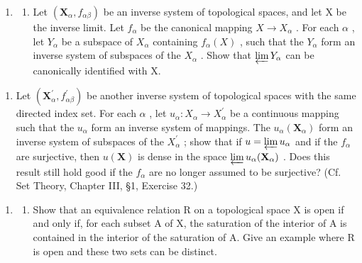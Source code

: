 \begin{enumerate}
\def\labelenumi{\arabic{enumi})}
\setcounter{enumi}{9}
\tightlist
\item
  \begin{enumerate}
  \def\labelenumii{\alph{enumii})}
  \tightlist
  \item
    Let \((\mathbf{X}_{\alpha}, f_{\alpha\beta})\) be an inverse system of topological spaces, and let X be the inverse limit. Let \(f_{\alpha}\) be the canonical mapping \(X \to X_{\alpha}\) . For each \(\alpha\) , let \(Y_{\alpha}\) be a subspace of \(X_{\alpha}\) containing \(f_{\alpha}(X)\) , such that the \(Y_{\alpha}\) form an inverse system of subspaces of the \(X_{\alpha}\) . Show that \(\varprojlim Y_{\alpha}\) can be canonically identified with X.
  \end{enumerate}
\end{enumerate}

\begin{enumerate}
\def\labelenumi{\alph{enumi})}
\setcounter{enumi}{1}
\tightlist
\item
  Let \((\mathbf{X}_{\alpha}^{\prime}, f_{\alpha\beta}^{\prime})\) be another inverse system of topological spaces with the same directed index set. For each \(\alpha\) , let \(u_{\alpha}: X_{\alpha} \to X_{\alpha}^{\prime}\) be a continuous mapping such that the \(u_{\alpha}\) form an inverse system of mappings. The \(u_{\alpha}(\mathbf{X}_{\alpha})\) form an inverse system of subspaces of the \(X_{\alpha}^{\prime}\) ; show that if \(u = \varprojlim u_{\alpha}\) and if the \(f_{\alpha}\) are surjective, then \(u(\mathbf{X})\) is dense in the space \(\varprojlim u_{\alpha}(\mathbf{X}_{\alpha})\) . Does this result still hold good if the \(f_{\alpha}\) are no longer assumed to be surjective? (Cf. Set Theory, Chapter III, §1, Exercise 32.)
\end{enumerate}

\BourbakiExerciseGroup

\begin{enumerate}
\def\labelenumi{\arabic{enumi})}
\tightlist
\item
  \begin{enumerate}
  \def\labelenumii{\alph{enumii})}
  \tightlist
  \item
    Show that an equivalence relation R on a topological space X is open if and only if, for each subset A of X, the saturation of the interior of A is contained in the interior of the saturation of A. Give an example where R is open and these two sets can be distinct.
  \end{enumerate}
\end{enumerate}

